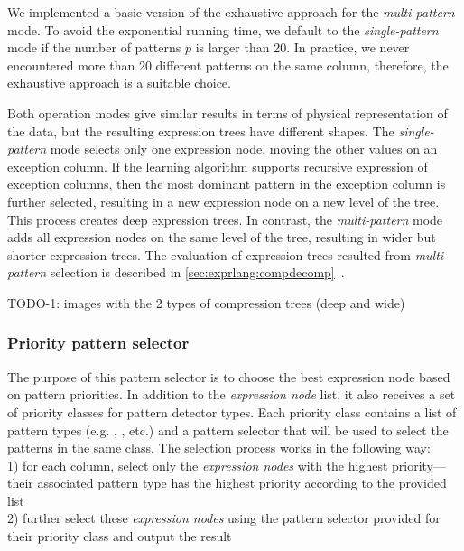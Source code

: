 We implemented a basic version of the exhaustive approach for the \textit{multi-pattern} mode. To avoid the exponential running time, we default to the \textit{single-pattern} mode if the number of patterns \(p\) is larger than 20. In practice, we never encountered more than 20 different patterns on the same column, therefore, the exhaustive approach is a suitable choice.

Both operation modes give similar results in terms of physical representation of the data, but the resulting expression trees have different shapes. The \textit{single-pattern} mode selects only one expression node, moving the other values on an exception column. If the learning algorithm supports recursive expression of exception columns, then the most dominant pattern in the exception column is further selected, resulting in a new expression node on a new level of the tree. This process creates deep expression trees. In contrast, the \textit{multi-pattern} mode adds all expression nodes on the same level of the tree, resulting in wider but shorter expression trees. The evaluation of expression trees resulted from \textit{multi-pattern} selection is described in \ref{sec:exprlang:compdecomp}~.

TODO-1: images with the 2 types of compression trees (deep and wide)

\subsubsection{Priority pattern selector}
\label{subsubsec:ps:priority}

The purpose of this pattern selector is to choose the best expression node based on pattern priorities. In addition to the \textit{expression node} list, it also receives a set of priority classes for pattern detector types. Each priority class contains a list of pattern types (e.g. , , etc.) and a pattern selector that will be used to select the patterns in the same class. The selection process works in the following way:\\
1) for each column, select only the \textit{expression nodes} with the highest priority---their associated pattern type has the highest priority according to the provided list\\
2) further select these \textit{expression nodes} using the pattern selector provided for their priority class and output the result

